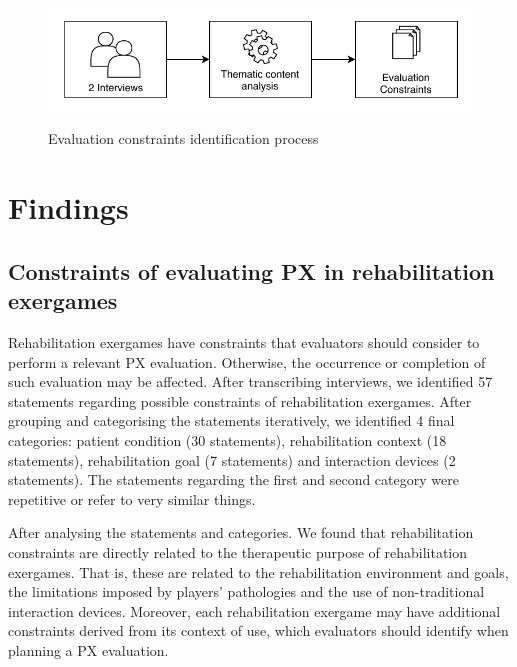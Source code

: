 \begin{figure}[htb]
\myfloatalign
{\includegraphics[width=\linewidth]{gfx/characterisation/constraintsIdentification}} \quad
\caption{Evaluation constraints identification process}\label{fig:constraintsIdentification}
\end{figure}

\section{Findings} %
\label{sec:findings_char}
\subsection{Constraints of evaluating PX in rehabilitation exergames} %
\label{sec:constraints}

Rehabilitation exergames have constraints that evaluators should consider to perform a relevant PX evaluation. Otherwise, the occurrence or completion of such evaluation may be affected. After transcribing interviews, we identified 57 statements regarding possible constraints of rehabilitation exergames. After grouping and categorising the statements iteratively, we identified 4 final categories: patient condition (30 statements), rehabilitation context (18 statements), rehabilitation goal (7 statements) and interaction devices (2 statements). The statements regarding the first and second category were repetitive or refer to very similar things.

After analysing the statements and categories. We found that rehabilitation constraints are directly related to the therapeutic purpose of rehabilitation exergames. That is, these are related to the rehabilitation environment and goals, the limitations imposed by players' pathologies and the use of non-traditional interaction devices. Moreover, each rehabilitation exergame may have additional constraints derived from its context of use, which evaluators should identify when planning a \ac{PX} evaluation.


